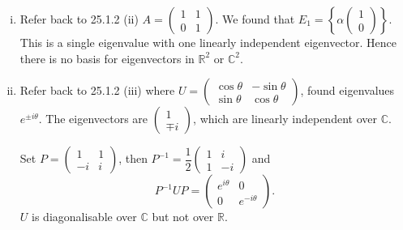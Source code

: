 \documentclass[10pt]{article}
\begin{document}
    \begin{example}
        \begin{enumerate}[(i)]
            \item Refer back to 25.1.2 (ii) $ A=\begin{pmatrix}
                1&1\\0&1
            \end{pmatrix} $. We found that $ E_1=\left\{ \alpha\begin{pmatrix}
                1\\0
            \end{pmatrix} \right\} $. This is a single eigenvalue with one linearly independent eigenvector. Hence there is no basis for eigenvectors in $ \mathbb{R}^{2} $ or $ \mathbb{C}^{2} $.
            \item Refer back to 25.1.2 (iii) where $U = \begin{pmatrix}
                \cos \theta&-\sin \theta\\
                \sin \theta&\cos \theta
            \end{pmatrix}$, found eigenvalues $ e^{\pm i\theta} $. The eigenvectors are $ \begin{pmatrix}
                1\\\mp i
            \end{pmatrix} $, which are linearly independent over $\mathbb{C}$.

            Set $ P=\begin{pmatrix}
                1&1\\-i&i
            \end{pmatrix} $, then $ P^{-1}=\dfrac{1}{2}\begin{pmatrix}
                1&i\\1&-i
            \end{pmatrix} $ and 
            \[
                P^{-1}UP=\begin{pmatrix}
                    e^{i\theta}&0\\
                    0&e^{-i\theta}
                \end{pmatrix}
            .\]
            $U$ is diagonalisable over $ \mathbb{C}  $ but not over $ \mathbb{R}  $.
        \end{enumerate}
    \end{example}
\end{document}
